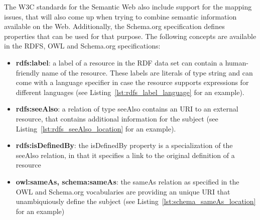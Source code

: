 The \gls{W3C} standards for the Semantic Web also include support for the mapping issues, that will also come up when trying to combine semantic information available on the Web. Additionally, the Schema.org specification defines properties that can be used for that purpose. The following concepts are available in the \gls{RDFS}, \gls{OWL} and Schema.org specifications: \@

\begin{itemize}
	\item \textbf{rdfs:label}: a label of a resource in the \gls{RDF} data set can contain a human-friendly name of the resource. These labels are literals of type string and can come with a language specifier in case the resource supports expressions for different languages (see Listing~\ref{lst:rdfs_label_language} for an example).
	\item \textbf{rdfs:seeAlso}: a relation of type seeAlso contains an \gls{URI} to an external resource, that contains additional information for the subject (see Listing~\ref{lst:rdfs_seeAlso_location} for an example).
	\item \textbf{rdfs:isDefinedBy}: the isDefinedBy property is a specialization of the seeAlso relation, in that it specifies a link to the original definition of a resource
	\item \textbf{owl:sameAs, schema:sameAs}: the sameAs relation as specified in the \gls{OWL} and Schema.org vocabularies are providing an unique \gls{URI} that unambiquiously define the subject (see Listing~\ref{lst:schema_sameAs_location} for an example)
\end{itemize}




